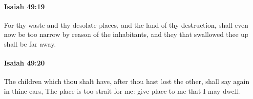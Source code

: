 		\paragraph{Isaiah 49:19} %
			\label{ISAIAH-49-19}

			For thy waste and thy desolate places, and the land of thy destruction, shall even now be too narrow by reason of the inhabitants, and they that swallowed thee up shall be far away.


		\paragraph{Isaiah 49:20} %
			\label{ISAIAH-49-20}

			The children which thou shalt have, after thou hast lost the other, shall say again in thine ears, The place is too strait for me: give place to me that I may dwell.


